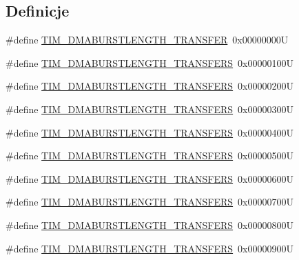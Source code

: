 \subsection*{Definicje}
\begin{DoxyCompactItemize}
\item 
\#define \hyperlink{group___t_i_m___d_m_a___burst___length_ga74f07b4a10022d71f31ec6e1b2b69276}{T\+I\+M\+\_\+\+D\+M\+A\+B\+U\+R\+S\+T\+L\+E\+N\+G\+T\+H\+\_\+T\+R\+A\+N\+S\+F\+ER}~0x00000000U
\item 
\#define \hyperlink{group___t_i_m___d_m_a___burst___length_gab114592091a00e0a6b9ae464485bd7bb}{T\+I\+M\+\_\+\+D\+M\+A\+B\+U\+R\+S\+T\+L\+E\+N\+G\+T\+H\+\_\+T\+R\+A\+N\+S\+F\+E\+RS}~0x00000100U
\item 
\#define \hyperlink{group___t_i_m___d_m_a___burst___length_gad91c14f0930803593ecdbd98002fea0a}{T\+I\+M\+\_\+\+D\+M\+A\+B\+U\+R\+S\+T\+L\+E\+N\+G\+T\+H\+\_\+T\+R\+A\+N\+S\+F\+E\+RS}~0x00000200U
\item 
\#define \hyperlink{group___t_i_m___d_m_a___burst___length_ga9ada9605ae6ff6e4ada9701263bef812}{T\+I\+M\+\_\+\+D\+M\+A\+B\+U\+R\+S\+T\+L\+E\+N\+G\+T\+H\+\_\+T\+R\+A\+N\+S\+F\+E\+RS}~0x00000300U
\item 
\#define \hyperlink{group___t_i_m___d_m_a___burst___length_ga740a6446c0a517cc3e235fddee45fef5}{T\+I\+M\+\_\+\+D\+M\+A\+B\+U\+R\+S\+T\+L\+E\+N\+G\+T\+H\+\_\+T\+R\+A\+N\+S\+F\+E\+RS}~0x00000400U
\item 
\#define \hyperlink{group___t_i_m___d_m_a___burst___length_ga905c206d2a028e3fb92bcab8f9f7c869}{T\+I\+M\+\_\+\+D\+M\+A\+B\+U\+R\+S\+T\+L\+E\+N\+G\+T\+H\+\_\+T\+R\+A\+N\+S\+F\+E\+RS}~0x00000500U
\item 
\#define \hyperlink{group___t_i_m___d_m_a___burst___length_gae75055ac13b73baf9326f1d6157853a7}{T\+I\+M\+\_\+\+D\+M\+A\+B\+U\+R\+S\+T\+L\+E\+N\+G\+T\+H\+\_\+T\+R\+A\+N\+S\+F\+E\+RS}~0x00000600U
\item 
\#define \hyperlink{group___t_i_m___d_m_a___burst___length_gac6b24f5b7d9e1968b4bfcaeb24e718fc}{T\+I\+M\+\_\+\+D\+M\+A\+B\+U\+R\+S\+T\+L\+E\+N\+G\+T\+H\+\_\+T\+R\+A\+N\+S\+F\+E\+RS}~0x00000700U
\item 
\#define \hyperlink{group___t_i_m___d_m_a___burst___length_ga73fff75a3f0247c61a84a42e8cb83572}{T\+I\+M\+\_\+\+D\+M\+A\+B\+U\+R\+S\+T\+L\+E\+N\+G\+T\+H\+\_\+T\+R\+A\+N\+S\+F\+E\+RS}~0x00000800U
\item 
\#define \hyperlink{group___t_i_m___d_m_a___burst___length_ga793a89bb8a0669e274de451985186c53}{T\+I\+M\+\_\+\+D\+M\+A\+B\+U\+R\+S\+T\+L\+E\+N\+G\+T\+H\+\_\+T\+R\+A\+N\+S\+F\+E\+RS}~0x00000900U

\end{DoxyCompactItemize}
